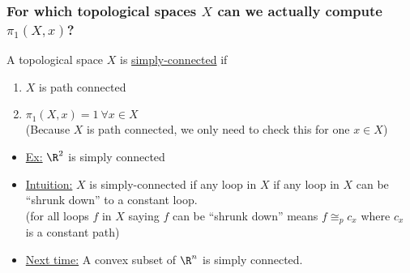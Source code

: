     \subsubsection{ For which topological spaces $X$ can we actually compute $\pi_1(X,x)$?}
    \begin{definition} A topological space $X$ is \underline{simply-connected} if
    \begin{enumerate}
        \item $X$ is path connected
        \item $\pi_1(X,x)={1}\ \forall x\in X$\\
            (Because $X$ is path connected, we only need to check this for one $x\in X$)
    \end{enumerate}
    \end{definition}
    \begin{itemize}
        \item \underline{Ex:} $\R^2$ is simply connected
        \item \underline{Intuition:} $X$ is simply-connected if any loop in $X$ if any loop in $X$ can
            be ``shrunk down'' to a constant loop.\\
            (for all loops $f$ in $X$ saying $f$ can be ``shrunk down'' means $f\cong_{p}c_x$ where $c_x$ is a constant path)
        \item \underline{Next time:} A convex subset of $\R^n$ is simply connected.
    \end{itemize}
